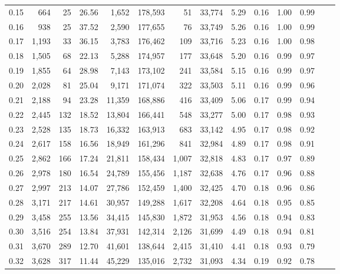 \begin{tabular}{rrrrrrrrrrrrrr}
0.15 &    664 &   25 &   26.56 &    1,652 &  178,593 &      51 &  33,774 &  5.29 &  0.16 &  1.00 &      0.99 \\
0.16 &    938 &   25 &   37.52 &    2,590 &  177,655 &      76 &  33,749 &  5.26 &  0.16 &  1.00 &      0.99 \\
0.17 &  1,193 &   33 &   36.15 &    3,783 &  176,462 &     109 &  33,716 &  5.23 &  0.16 &  1.00 &      0.98 \\
0.18 &  1,505 &   68 &   22.13 &    5,288 &  174,957 &     177 &  33,648 &  5.20 &  0.16 &  0.99 &      0.97 \\
0.19 &  1,855 &   64 &   28.98 &    7,143 &  173,102 &     241 &  33,584 &  5.15 &  0.16 &  0.99 &      0.97 \\
0.20 &  2,028 &   81 &   25.04 &    9,171 &  171,074 &     322 &  33,503 &  5.11 &  0.16 &  0.99 &      0.96 \\
0.21 &  2,188 &   94 &   23.28 &   11,359 &  168,886 &     416 &  33,409 &  5.06 &  0.17 &  0.99 &      0.94 \\
0.22 &  2,445 &  132 &   18.52 &   13,804 &  166,441 &     548 &  33,277 &  5.00 &  0.17 &  0.98 &      0.93 \\
0.23 &  2,528 &  135 &   18.73 &   16,332 &  163,913 &     683 &  33,142 &  4.95 &  0.17 &  0.98 &      0.92 \\
0.24 &  2,617 &  158 &   16.56 &   18,949 &  161,296 &     841 &  32,984 &  4.89 &  0.17 &  0.98 &      0.91 \\
0.25 &  2,862 &  166 &   17.24 &   21,811 &  158,434 &   1,007 &  32,818 &  4.83 &  0.17 &  0.97 &      0.89 \\
0.26 &  2,978 &  180 &   16.54 &   24,789 &  155,456 &   1,187 &  32,638 &  4.76 &  0.17 &  0.96 &      0.88 \\
0.27 &  2,997 &  213 &   14.07 &   27,786 &  152,459 &   1,400 &  32,425 &  4.70 &  0.18 &  0.96 &      0.86 \\
0.28 &  3,171 &  217 &   14.61 &   30,957 &  149,288 &   1,617 &  32,208 &  4.64 &  0.18 &  0.95 &      0.85 \\
0.29 &  3,458 &  255 &   13.56 &   34,415 &  145,830 &   1,872 &  31,953 &  4.56 &  0.18 &  0.94 &      0.83 \\
0.30 &  3,516 &  254 &   13.84 &   37,931 &  142,314 &   2,126 &  31,699 &  4.49 &  0.18 &  0.94 &      0.81 \\
0.31 &  3,670 &  289 &   12.70 &   41,601 &  138,644 &   2,415 &  31,410 &  4.41 &  0.18 &  0.93 &      0.79 \\
0.32 &  3,628 &  317 &   11.44 &   45,229 &  135,016 &   2,732 &  31,093 &  4.34 &  0.19 &  0.92 &      0.78 \\

\end{tabular}
